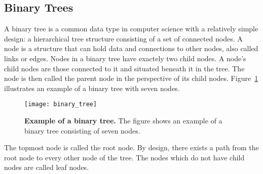 
%


\subsection{Binary Trees}
A binary tree is a common data type in computer science with a relatively simple design: a hierarchical tree structure consisting of a set of connected nodes. A node is a structure that can hold data and connections to other nodes, also called links or edges. Nodes in a binary tree have exactely two child nodes. A node's child nodes are those connected to it and situated beneath it in the tree. The node is then called the parent node in the perspective of its child nodes. Figure~\ref{fig:binary_tree_illustration} illustrates an example of a binary tree with seven nodes.
\begin{figure}[!ht]
\centering
\texttt{[image: binary\_tree]}
\caption[Example of a binary tree]{
  \textbf{Example of a binary tree.}
  The figure shows an example of a binary tree consisting of seven nodes.
}
\label{fig:binary_tree_illustration}
\end{figure}
The topmost node is called the root node. By design, there exists a path from the root node to every other node of the tree. The nodes which do not have child nodes are called leaf nodes.

